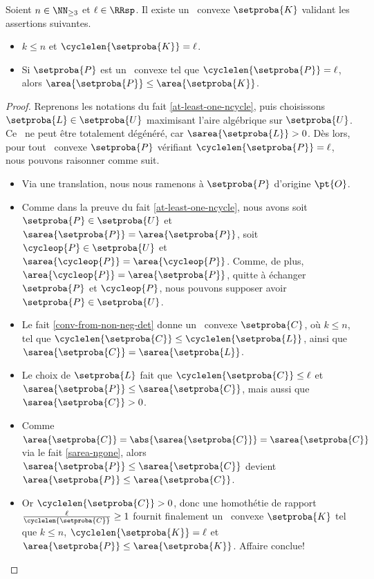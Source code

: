 \begin{fact} \label{at-least-one-kgone}
    Soient $n \in \NN_{\geq3}$ et $\ell \in \RRsp$.
    Il existe un \kgone\ convexe $\setproba{K}$ validant les assertions suivantes.
	\begin{itemize}
		\item $k \leq n$ et $\cyclelen{\setproba{K}} = \ell$.

		\item Si $\setproba{P}$ est un \ngone\ convexe tel que $\cyclelen{\setproba{P}} = \ell$, alors $\area{\setproba{P}} \leq \area{\setproba{K}}$.
    \end{itemize}
\end{fact}


\begin{proof}
    Reprenons les notations du fait \ref{at-least-one-ncycle}, puis 
    choisissons $\setproba{L} \in \setproba{U}$ maximisant l'aire algébrique sur $\setproba{U}$.
    Ce \ncycle\ ne peut être totalement dégénéré, car $\sarea{\setproba{L}} > 0$.
    Dès lors, pour tout \ngone\ convexe $\setproba{P}$ vérifiant $\cyclelen{\setproba{P}} = \ell$, nous pouvons raisonner comme suit. 
	\begin{itemize}
		\item Via une translation, nous nous ramenons à $\setproba{P}$ d'origine $\pt{O}$.


		\item Comme dans la preuve du fait \ref{at-least-one-ncycle}, nous avons
		soit $\setproba{P} \in \setproba{U}$ et $\sarea{\setproba{P}} = \area{\setproba{P}}$,
		soit $\cycleop{P} \in \setproba{U}$ et $\sarea{\cycleop{P}} = \area{\cycleop{P}}$.
		Comme, de plus, $\area{\cycleop{P}} = \area{\setproba{P}}$,
		quitte à échanger $\setproba{P}$ et $\cycleop{P}$,
		nous pouvons supposer avoir $\setproba{P} \in \setproba{U}$.


		\item Le fait \ref{conv-from-non-neg-det} donne un \kgone\ convexe $\setproba{C}$, où $k \leq n$, tel que
		$\cyclelen{\setproba{C}} \leq \cyclelen{\setproba{L}}$,
		ainsi que
		$\sarea{\setproba{C}} = \sarea{\setproba{L}}$.


		\item Le choix de $\setproba{L}$ fait que 
		$\cyclelen{\setproba{C}} \leq \ell$
		et
		$\sarea{\setproba{P}} \leq \sarea{\setproba{C}}$,
		mais aussi que
		$\sarea{\setproba{C}} > 0$.


		\item Comme
		$\area{\setproba{C}} = \abs{\sarea{\setproba{C}}} = \sarea{\setproba{C}}$
		via le fait \ref{sarea-ngone},
		alors
		$\sarea{\setproba{P}} \leq \sarea{\setproba{C}}$
		devient
		$\area{\setproba{P}} \leq \area{\setproba{C}}$.


		\item Or $\cyclelen{\setproba{C}} > 0$, donc une homothétie de rapport $\frac{\ell}{\cyclelen{\setproba{C}}} \geq 1$ fournit finalement un \kgone\ convexe $\setproba{K}$ tel que
		$k \leq n$,
		$\cyclelen{\setproba{K}} = \ell$
		et
		$\area{\setproba{P}} \leq \area{\setproba{K}}$.
		Affaire conclue!
	\end{itemize}

	\null\vspace{-3.5ex}
\end{proof}
